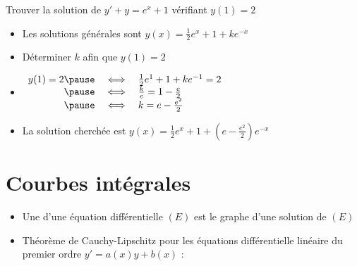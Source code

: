 \begin{frame}

\begin{exemple}
Trouver la solution de $y'+y = e^x+1$ vérifiant $y(1)=2$

\pause
\begin{itemize}
  \item Les solutions générales sont $y(x) = \frac12e^{x}+1 + k e^{-x}$
  \pause
  \item Déterminer $k$ afin que $y(1)=2$
  \pause
  \item 
  $\begin{array}{rcl}
   y(1)=2 
   \pause
     & \iff & \frac12e^{1}+1 + k e^{-1} = 2 \\
    \pause 
     & \iff & \frac{k}{e} = 1 - \frac{e}{2} \\
    \pause 
     & \iff & k = e - \frac{e^2}{2}  
   \end{array}
$
\pause
  \item La solution cherchée est $y(x) = \frac12e^{x}+1 + \left(e - \frac{e^2}{2}\right)e^{-x}$
\end{itemize}

\end{exemple}
\end{frame}




\section*{Courbes intégrales}

\begin{frame}
\begin{itemize}
  \item Une  d'une équation différentielle $(E)$
est le graphe d'une solution de $(E)$

\bigskip
\pause

  \item Théorème de Cauchy-Lipschitz pour les équations 
différentielle linéaire du premier ordre $y'=a(x)y + b(x)$ :
\end{itemize}
\end{frame}


